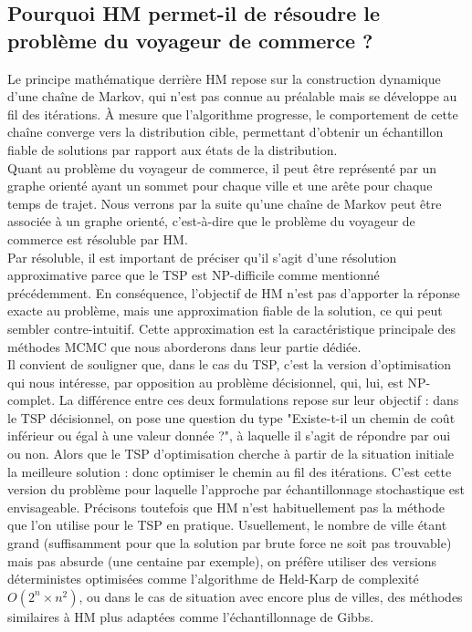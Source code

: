 \documentclass{article}
\begin{document}
\subsection{Pourquoi HM permet-il de résoudre le problème du voyageur de commerce ?}

Le principe mathématique derrière HM repose sur la construction dynamique d'une chaîne de Markov, qui n'est pas connue au préalable mais se développe au fil des itérations. À mesure que l'algorithme progresse, le comportement de cette chaîne converge vers la distribution cible, permettant d'obtenir un échantillon fiable de solutions par rapport aux états de la distribution. \\
Quant au problème du voyageur de commerce, il peut être représenté par un graphe orienté ayant un sommet pour chaque ville et une arête pour chaque temps de trajet. Nous verrons par la suite qu'une chaîne de Markov peut être associée à un graphe orienté, c'est-à-dire que le problème du voyageur de commerce est résoluble par HM. \\
Par résoluble, il est important de préciser qu'il s'agit d'une résolution approximative parce que le TSP est NP-difficile comme mentionné précédemment.
En conséquence, l'objectif de HM n'est pas d'apporter la réponse exacte au problème, mais une approximation fiable de la solution, ce qui peut sembler contre-intuitif. Cette approximation est la caractéristique principale des méthodes MCMC que nous aborderons dans leur partie dédiée. \\

Il convient de souligner que, dans le cas du TSP, c'est la version d'optimisation qui nous intéresse, par opposition au problème décisionnel, qui, lui, est NP-complet. La différence entre ces deux formulations repose sur leur objectif : dans le TSP décisionnel, on pose une question du type "Existe-t-il un chemin de coût inférieur ou égal à une valeur donnée ?", à laquelle il s'agit de répondre par oui ou non.
Alors que le TSP d'optimisation cherche à partir de la situation initiale la meilleure solution : donc optimiser le chemin au fil des itérations. C'est cette version du problème pour laquelle l'approche par échantillonnage stochastique est envisageable.
Précisons toutefois que HM n'est habituellement pas la méthode que l'on utilise pour le TSP en pratique. Usuellement, le nombre de ville étant grand (suffisamment pour que la solution par brute force ne soit pas trouvable) mais pas absurde (une centaine par exemple), on préfère utiliser des versions déterministes optimisées comme l'algorithme de Held-Karp de complexité $O(2^n \times n^2)$, ou dans le cas de situation avec encore plus de villes, des méthodes similaires à HM plus adaptées comme l'échantillonnage de Gibbs.
\end{document}
